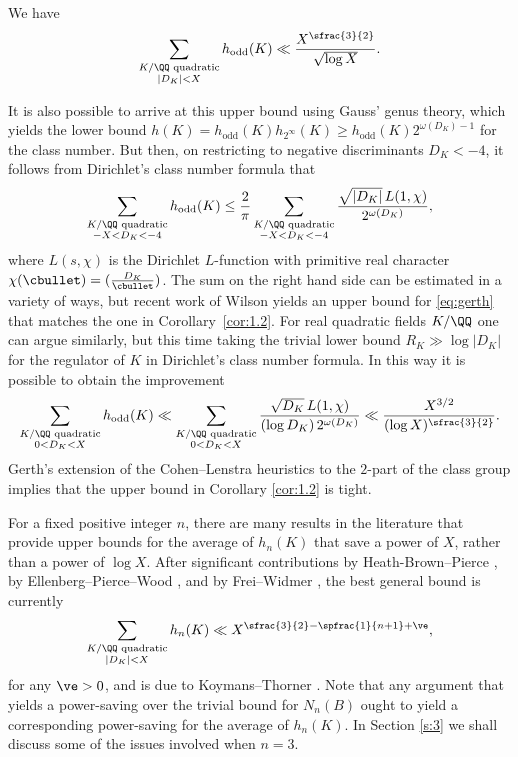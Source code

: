 \begin{corollary}\label{cor:1.2}
We have
\[
\sum_{
\substack{K/\QQ \textup{ quadratic}\\
|D_K|<X
}} h_\textup{odd}(K)\ll \frac{X^{\sfrac{3}{2}}}{\sqrt{\log X}}.
\]
\end{corollary}

It is also possible to arrive at this upper bound using Gauss' genus theory, which yields the lower bound
$h(K)=h_{\text{odd}}(K)h_{2^\infty}(K)\geq h_{\text{odd}}(K)2^{\omega(D_K)-1}$ for the class number.
But then, on restricting to negative discriminants $D_K<-4$, it follows from
Dirichlet's class number formula that
\begin{equation}\label{eq:gerth}
\sum_{
\substack{K/\QQ \text{ quadratic}\\
-X<D_K<-4
}} h_\text{odd}(K)\leq
\frac{2}{\pi}
\sum_{
\substack{K/\QQ \text{ quadratic}\\
-X<D_K<-4
}} \frac{\sqrt{|D_K|}\,L(1,\chi)}{2^{\omega(D_K)}},
\end{equation}
where
$L(s,\chi)$ is the Dirichlet $L$-function
with primitive real character $\chi(\cbullet)=(\frac{D_K}{\cbullet})$.
The sum on the right hand side can be estimated in a variety of ways, but recent work of Wilson \cite[Cor.\,1.6]{wilson} yields an upper bound for
\eqref{eq:gerth} that matches the one in Corollary~\ref{cor:1.2}.
For real quadratic fields $K/\QQ$ one can argue similarly, but this time taking the trivial lower bound $R_K\gg \log |D_K|$ for the regulator of $K$ in Dirichlet's class number formula.
In this way it is possible to obtain the improvement
\[
\sum_{
\substack{K/\QQ \text{ quadratic}\\
0<D_K<X
}} h_\text{odd}(K)
\ll
\sum_{
\substack{K/\QQ \text{ quadratic}\\
0<D_K<X
}} \frac{\sqrt{D_K}\,L(1,\chi)}{(\log D_K)\, 2^{\omega(D_K)}}
\ll\frac{X^{3/2}}{(\log X)^{\sfrac{3}{2}}}.
\]
Gerth's \cite{gerth1,gerth2} extension of the Cohen--Lenstra heuristics to the $2$-part of the class group implies that
the upper bound in
Corollary \ref{cor:1.2} is tight.

For a fixed positive integer $n$,
there are many results in the literature
that provide
upper bounds for the average of $h_n(K)$
that save a power of $X$, rather than a power of $\log X$.
After significant contributions by
Heath-Brown--Pierce \cite{hb-p}, by
Ellenberg--Pierce--Wood
\cite{pierce2}, and
by Frei--Widmer
\cite{frei},
the best general bound is
currently
\[
\sum_{
\substack{K/\QQ \text{ quadratic}\\
|D_K|<X
}} h_n(K)\ll X^{\sfrac{3}{2}
-\spfrac{1}{n+1}+\ve},
\]
for any $\ve>0$, and is
due to Koymans--Thorner \cite{koy}.
Note that any argument that yields a power-saving over the trivial
bound for $N_n(B)$
ought to yield a corresponding power-saving for the average of $h_n(K)$.
In Section \ref{s:3} we shall discuss some of the issues involved when
$n=3$.

